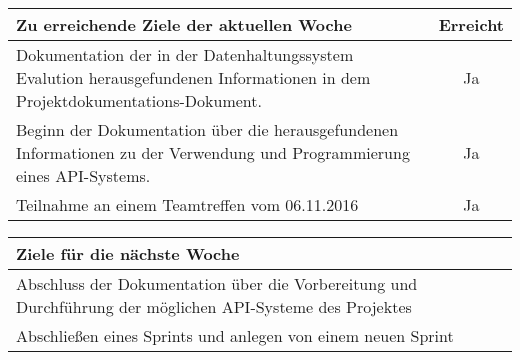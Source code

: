 \begin{tabularx}{\textwidth}{Xc}
    \arrayrulecolor{OliveGreen}
    \toprule
    {\bfseries Zu erreichende Ziele der aktuellen Woche} & {\bfseries Erreicht} \\
    \midrule[2pt]
    Dokumentation der in der Datenhaltungssystem Evalution
    herausgefundenen Informationen in dem 
    Projektdokumentations-Dokument.  &  Ja  \\
    \rowcolor{OliveGreen!15}
    Beginn der Dokumentation über die herausgefundenen Informationen
    zu der Verwendung und Programmierung eines API-Systems.  &  Ja \\
    \rowcolor{White}
    Teilnahme an einem Teamtreffen vom 06.11.2016  &  Ja \\
    \bottomrule[2pt]
\end{tabularx}
%
\vspace{1cm}
%
\begin{tabularx}{\textwidth}{Xc}
    \arrayrulecolor{OliveGreen}
    \toprule
    {\bfseries Ziele für die nächste Woche}              &                      \\
    \midrule[2pt]
    Abschluss der Dokumentation über die Vorbereitung und Durchführung der
    möglichen API-Systeme des Projektes  & \\
    \rowcolor{OliveGreen!15}
    Abschließen eines Sprints und anlegen von einem neuen Sprint  &  \\
    \midrule[2pt]
\end{tabularx}
